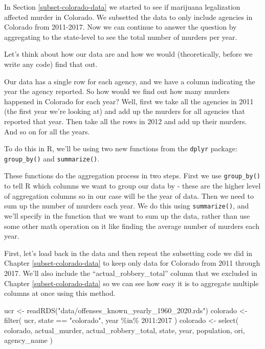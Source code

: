 \documentclass[
]{krantz}
\makeatletter
\newenvironment{Shaded}{\begin{snugshade}}{\end{snugshade}}
\newcommand{\DecValTok}[1]{\textcolor[rgb]{0.06,0.06,0.06}{#1}}
\newcommand{\FunctionTok}[1]{\textcolor[rgb]{0,0,0}{#1}}
\newcommand{\NormalTok}[1]{#1}
\newcommand{\OtherTok}[1]{\textcolor[rgb]{0.37,0.37,0.37}{#1}}
\newcommand{\SpecialCharTok}[1]{\textcolor[rgb]{0,0,0}{#1}}
\newcommand{\StringTok}[1]{\textcolor[rgb]{0.5,0.5,0.5}{#1}}
\newenvironment{kframe}{%
\medskip{}
\setlength{\fboxsep}{.8em}
 \def\at@end@of@kframe{}%
 \ifinner\ifhmode%
  \def\at@end@of@kframe{\end{minipage}}%
  \begin{minipage}{\columnwidth}%
 \fi\fi%
 \def\FrameCommand##1{\hskip\@totalleftmargin \hskip-\fboxsep
 \colorbox{shadecolor}{##1}\hskip-\fboxsep
     \hskip-\linewidth \hskip-\@totalleftmargin \hskip\columnwidth}%
 \MakeFramed {\advance\hsize-\width
   \@totalleftmargin\z@ \linewidth\hsize
   \@setminipage}}%
 {\par\unskip\endMakeFramed%
 \at@end@of@kframe}
\renewenvironment{Shaded}{\begin{kframe}}{\end{kframe}}
\makeatother
\begin{document}
In Section \ref{subset-colorado-data} we started to see if
marijuana legalization affected murder in Colorado. We
subsetted the data to only include agencies in Colorado from
2011-2017. Now we can continue to answer the question by
aggregating to the state-level to see the total number of
murders per year.

Let's think about how our data are and how we would
(theoretically, before we write any code) find that out.

Our data has a single row for each agency, and we have a
column indicating the year the agency reported. So how would
we find out how many murders happened in Colorado for each
year? Well, first we take all the agencies in 2011 (the
first year we're looking at) and add up the murders for all
agencies that reported that year. Then take all the rows in
2012 and add up their murders. And so on for all the years.

To do this in R, we'll be using two new functions from the
\texttt{dplyr} package: \texttt{group\_by()} and
\texttt{summarize()}.

These functions do the aggregation process in two steps.
First we use \texttt{group\_by()} to tell R which columns we
want to group our data by - these are the higher level of
aggregation columns so in our case will be the year of data.
Then we need to sum up the number of murders each year. We
do this using \texttt{summarize()}, and we'll specify in the
function that we want to sum up the data, rather than use
some other math operation on it like finding the average
number of murders each year.

First, let's load back in the data and then repeat the
subsetting code we did in Chapter \ref{subset-colorado-data}
to keep only data for Colorado from 2011 through 2017. We'll
also include the ``actual\_robbery\_total'' column that we
excluded in Chapter \ref{subset-colorado-data} so we can see
how easy it is to aggregate multiple columns at once using
this method.

\begin{Shaded}
\begin{Highlighting}[]
\NormalTok{ucr }\OtherTok{\textless{}{-}} \FunctionTok{readRDS}\NormalTok{(}\StringTok{"data/offenses\_known\_yearly\_1960\_2020.rds"}\NormalTok{)}
\NormalTok{colorado }\OtherTok{\textless{}{-}} \FunctionTok{filter}\NormalTok{(}
\NormalTok{  ucr, state }\SpecialCharTok{==} \StringTok{"colorado"}\NormalTok{,}
\NormalTok{  year }\SpecialCharTok{\%in\%} \DecValTok{2011}\SpecialCharTok{:}\DecValTok{2017}
\NormalTok{)}
\NormalTok{colorado }\OtherTok{\textless{}{-}} \FunctionTok{select}\NormalTok{(}
\NormalTok{  colorado, actual\_murder, actual\_robbery\_total,}
\NormalTok{  state, year, population, ori, agency\_name}
\NormalTok{)}
\end{Highlighting}
\end{Shaded}
\end{document}
